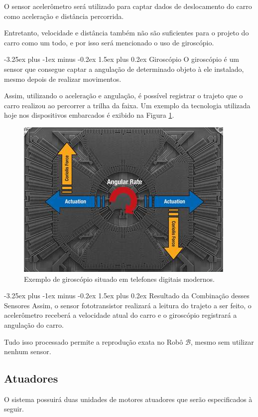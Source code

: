 \documentclass[portugues, brazil, a4paper,12pt]{article}
\makeatletter
\renewcommand{\paragraph}{\@startsection{paragraph}{4}{0ex}%
   {-3.25ex plus -1ex minus -0.2ex}%
   {1.5ex plus 0.2ex}%
   {\normalfont\normalsize\bfseries}}
\makeatother
\begin{document}
				O sensor acelerômetro será utilizado para captar dados de deslocamento do carro como aceleração e distância percorrida.

				Entretanto, velocidade e distância também não são suficientes para o projeto do carro como um todo, e por isso será mencionado o uso de giroscópio.


			\paragraph{Giroscópio}
				O giroscópio é um sensor que consegue captar a angulação de determinado objeto à ele instalado, mesmo depois de realizar movimentos.

				Assim, utilizando o aceleração e angulação, é possível registrar o trajeto que o carro realizou ao percorrer a trilha da faixa. Um exemplo da tecnologia utilizada hoje nos dispositivos embarcados é exibido na Figura \ref{fig:gyroscope}.

				\begin{figure}[H]
					\centering
					\includegraphics[width=0.6\linewidth]{img/elementos-gyroscope.jpg}
					\caption{Exemplo de giroscópio situado em telefones digitais modernos.}
					\label{fig:gyroscope}
				\end{figure}


			\paragraph{Resultado da Combinação desses Sensores}
				Assim, o sensor fototransistor realizará a leitura do trajeto a ser feito, o acelerômetro receberá a velocidade atual do carro e o giroscópio registrará a angulação do carro.

				Tudo isso processado permite a reprodução exata no Robô $ \mathcal{B} $, mesmo sem utilizar nenhum sensor.


	\subsection{Atuadores}
		O sistema possuirá duas unidades de motores atuadores que serão especificados à seguir.
\end{document}
